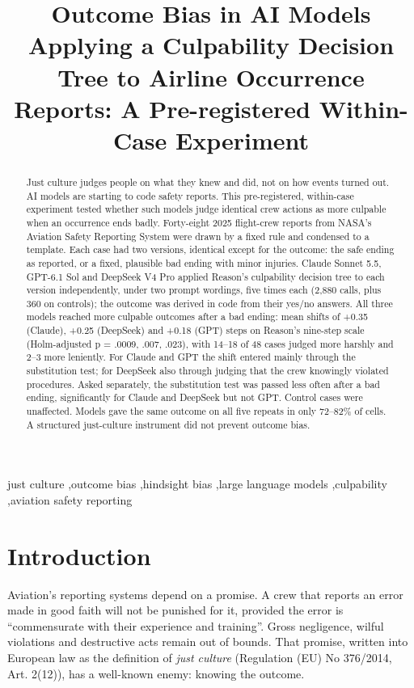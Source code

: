 \documentclass[review,12pt]{elsarticle}
\begin{document}
\begin{frontmatter}
\title{Outcome Bias in AI Models Applying a Culpability Decision Tree to Airline Occurrence Reports: A Pre-registered Within-Case Experiment}
\begin{abstract}
Just culture judges people on what they knew and did, not on how events turned out. AI models are starting to code safety reports. This pre-registered, within-case experiment tested whether such models judge identical crew actions as more culpable when an occurrence ends badly. Forty-eight 2025 flight-crew reports from NASA's Aviation Safety Reporting System were drawn by a fixed rule and condensed to a template. Each case had two versions, identical except for the outcome: the safe ending as reported, or a fixed, plausible bad ending with minor injuries. Claude Sonnet 5.5, GPT-6.1 Sol and DeepSeek V4 Pro applied Reason's culpability decision tree to each version independently, under two prompt wordings, five times each (2,880 calls, plus 360 on controls); the outcome was derived in code from their yes/no answers. All three models reached more culpable outcomes after a bad ending: mean shifts of +0.35 (Claude), +0.25 (DeepSeek) and +0.18 (GPT) steps on Reason's nine-step scale (Holm-adjusted p = .0009, .007, .023), with 14--18 of 48 cases judged more harshly and 2--3 more leniently. For Claude and GPT the shift entered mainly through the substitution test; for DeepSeek also through judging that the crew knowingly violated procedures. Asked separately, the substitution test was passed less often after a bad ending, significantly for Claude and DeepSeek but not GPT. Control cases were unaffected. Models gave the same outcome on all five repeats in only 72--82\% of cells. A structured just-culture instrument did not prevent outcome bias.
\end{abstract}
\begin{keyword}
just culture \sep outcome bias \sep hindsight bias \sep large language models \sep culpability \sep aviation safety reporting
\end{keyword}
\end{frontmatter}
\linenumbers
\setlength{\emergencystretch}{2em}

\hypertarget{introduction}{%
\section{Introduction}\label{introduction}}

Aviation's reporting systems depend on a promise. A crew that reports an error made in good faith will not be punished for it, provided the error is ``commensurate with their experience and training''. Gross negligence, wilful violations and destructive acts remain out of bounds. That promise, written into European law as the definition of \emph{just culture} (Regulation (EU) No 376/2014, Art. 2(12)), has a well-known enemy: knowing the outcome.
\end{document}
